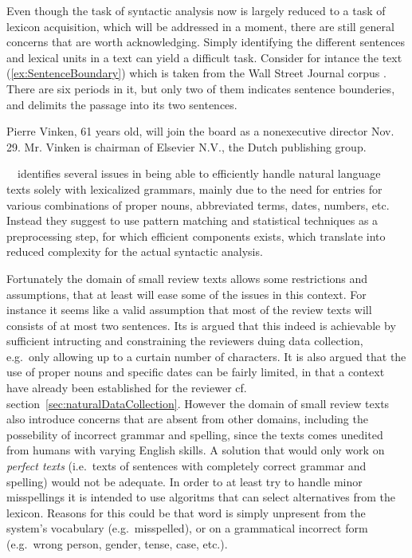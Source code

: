 Even though the task of syntactic analysis now is largely reduced to a task of lexicon acquisition, which will be addressed in a moment, there are still general concerns that are worth acknowledging. Simply identifying the different sentences and lexical units in a text can yield a difficult task. Consider for intance the text (\ref{ex:SentenceBoundary}) which is taken from the Wall Street Journal corpus \cite{wsjCorpus}. There are six periods in it, but only two of them indicates sentence bounderies, and delimits the passage into its two sentences.
\begin{numquote}
  Pierre Vinken, 61 years old, will join the board as a nonexecutive director Nov. 29. Mr. Vinken is chairman of Elsevier N.V., the Dutch publishing group.  
  \label{ex:SentenceBoundary}
\end{numquote}

\citeauthor{ectendingCCG}~\ identifies several issues in being able to efficiently handle natural language texts solely with lexicalized grammars, mainly due to the need for entries for various combinations of proper nouns, abbreviated terms, dates, numbers, etc. Instead they suggest to use pattern matching and statistical techniques as a preprocessing step, for which efficient components exists, which translate into reduced complexity for the actual syntactic analysis.

Fortunately the domain of small review texts allows some restrictions and assumptions, that at least will ease some of the issues in this context. For instance it seems like a valid assumption that most of the review texts will consists of at most two sentences. Its is argued that this indeed is achievable by sufficient intructing and constraining the reviewers duing data collection, e.g.\ only allowing up to a curtain number of characters. It is also argued that the use of proper nouns and specific dates can be fairly limited, in that a context have already been established for the reviewer cf. section~\ref{sec:naturalDataCollection}. However the domain of small review texts also introduce concerns that are absent from other domains, including the possebility of incorrect grammar and spelling, since the texts comes unedited from humans with varying English skills. A solution that would only work on \emph{perfect texts} (i.e.\ texts of sentences with completely correct grammar and spelling) would not be adequate. In order to at least try to handle minor misspellings it is intended to use algoritms that can select alternatives from the lexicon. Reasons for this could be that word is simply unpresent from the system's vocabulary (e.g.\ misspelled), or on a grammatical incorrect form (e.g.\ wrong person, gender, tense, case, etc.). 

